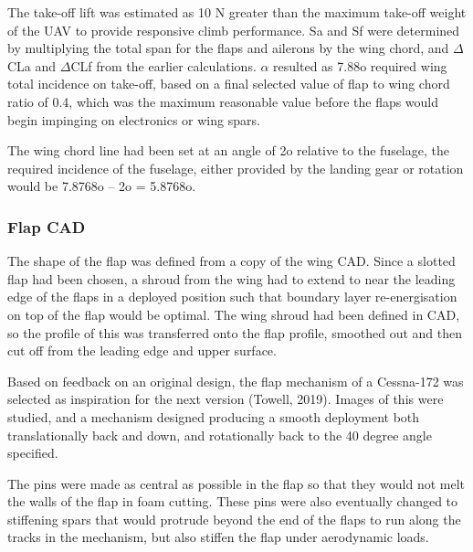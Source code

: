 \documentclass[../../main.tex]{subfiles}
\begin{document}

The take-off lift was estimated as 10 N greater than the maximum take-off weight of the UAV to provide responsive climb performance. Sa and Sf were determined by multiplying the total span for the flaps and ailerons by the wing chord, and $\Delta$CLa and $\Delta$CLf from the earlier calculations.
$\alpha$ resulted as 7.88o required wing total incidence on take-off, based on a final selected value of flap to wing chord ratio of 0.4, which was the maximum reasonable value before the flaps would begin impinging on electronics or wing spars.

The wing chord line had been set at an angle of 2o relative to the fuselage, the required incidence of the fuselage, either provided by the landing gear or rotation would be 7.8768o – 2o = 5.8768o. 

\subsubsection{Flap CAD} \label{sec:design-process:final-design-proposal:wing:flap-cad}

The shape of the flap was defined from a copy of the wing CAD.
Since a slotted flap had been chosen, a shroud from the wing had to extend to near the leading edge of the flaps in a deployed position such that boundary layer re-energisation on top of the flap would be optimal.
The wing shroud had been defined in CAD, so the profile of this was transferred onto the flap profile, smoothed out and then cut off from the leading edge and upper surface.  

Based on feedback on an original design, the flap mechanism of a Cessna-172 was selected as inspiration for the next version (Towell, 2019).
Images of this were studied, and a mechanism designed producing a smooth deployment both translationally back and down, and rotationally back to the 40 degree angle specified. 


The pins were made as central as possible in the flap so that they would not melt the walls of the flap in foam cutting.
These pins were also eventually changed to stiffening spars that would protrude beyond the end of the flaps to run along the tracks in the mechanism, but also stiffen the flap under aerodynamic loads.
\end{document}
